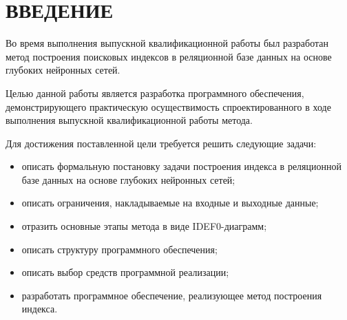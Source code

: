 \chapter*{ВВЕДЕНИЕ}

Во время выполнения выпускной квалификационной работы был разработан метод
построения поисковых индексов в реляционной базе данных на основе глубоких
нейронных сетей.

Целью данной работы является разработка программного обеспечения,
демонстрирующего практическую осуществимость спроектированного в ходе выполнения
выпускной квалификационной работы метода.

Для достижения поставленной цели требуется решить следующие задачи:
\begin{itemize}
    \item описать формальную постановку задачи построения индекса в реляционной
        базе данных на основе глубоких нейронных сетей;
    \item описать ограничения, накладываемые на входные и выходные данные;
    \item отразить основные этапы метода в виде IDEF0-диаграмм;
    \item описать структуру программного обеспечения;
    \item описать выбор средств программной реализации;
    \item разработать программное обеспечение, реализующее метод построения
        индекса.
\end{itemize}
